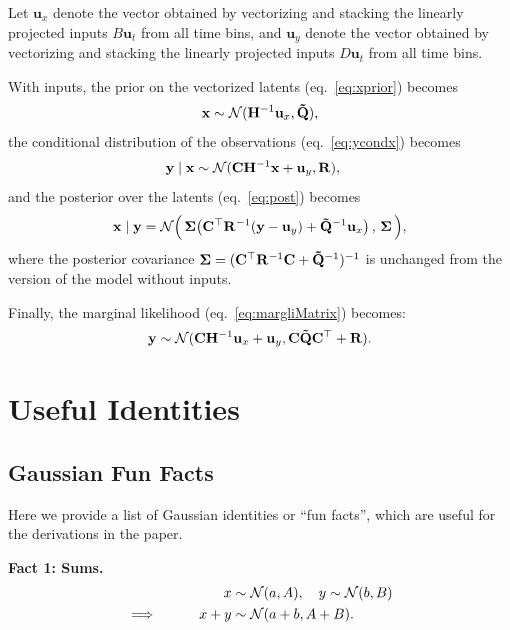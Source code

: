 \documentclass[10pt]{article}
\newcommand{\vx}{\mathbf{x}}
\newcommand{\vy}{\mathbf{y}}
\newcommand{\vu}{\mathbf{u}}
\newcommand{\mH}{\mathbf{H}}
\newcommand{\tmQ}{\mathbf{\tilde Q}}
\newcommand{\mSig}{{\mathbf{\Sigma}}}
\newcommand{\mR}{\mathbf{R}}
\newcommand{\mC}{\mathbf{C}}
\begin{document}
\begin{appendices}
Let $\vu_x$ denote the vector
obtained by vectorizing and stacking the linearly projected inputs $B\vu_t$ from all
time bins, and $\vu_y$ denote the vector obtained by vectorizing and
stacking the linearly projected inputs $D\vu_t$ from all time bins.

With inputs, the prior on the vectorized latents (eq.~\ref{eq:xprior}) becomes
\begin{equation}
  \label{eq:22}
  \vx \sim \Nrm(\mH\inv\vu_x,  \tmQ),
\end{equation}
the conditional distribution of the observations (eq.~\ref{eq:ycondx})
becomes
\begin{align} 
  \label{eq:}
  \vy\mid \vx &\sim \Nrm(\mC\mH\inv\vx+\vu_y,\mR),
\end{align}
and the posterior over the latents (eq.~\ref{eq:post}) becomes
\begin{equation}
  \label{eq:postInput}
  \vx \mid \vy = \Nrm \Big( \, \mSig \big(
  \mC\trp \mR\inv (\vy-\vu_y) +  \tmQ\inv \vu_x \big) \, , \,  \mSig \, \Big),
\end{equation}
where the posterior covariance $\mSig =  (\mC\trp \mR\inv \mC +
  \tmQ\inv)\inv$ is unchanged from the version of the model without inputs.


Finally, the marginal likelihood (eq.~\ref{eq:margliMatrix}) becomes:
\begin{equation}
  \label{eq:margliMatrixInput}
\vy \sim \Nrm(\mC \mH\inv \vu_x + \vu_y,\mC \tmQ  \mC\trp + \mR).
\end{equation}

    

\section{ Useful Identities}

\subsection{Gaussian Fun Facts}
Here we provide a list of Gaussian identities or ``fun facts'', which
are useful for the derivations in the paper. 
\label{sec:gff}

{\bf  Fact 1: Sums.}
\begin{alignat}{2}
&\qquad&  x &\sim \mathcal{N}(a,A),  \quad y \sim  \mathcal{N}(b,B) \nonumber \\
\implies & \qquad& x+y & \sim \mathcal{N}(a+b,A+B).
\label{eq:gffsum}
\end{alignat}


\end{appendices}
\end{document}
